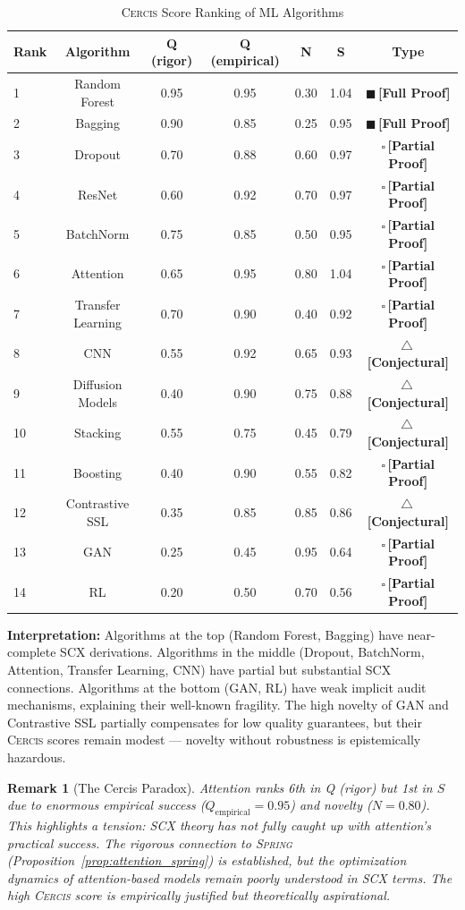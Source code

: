 \documentclass[12pt,a4paper]{article}
\newtheorem{remark}[theorem]{Remark}
\theoremstyle{definition}
\newcommand{\rigorFull}{{\color{rigorcolor}$\blacksquare$\,\textbf{[Full Proof]}}}
\newcommand{\rigorPartial}{{\color{rigorcolor}$\square$\,\textbf{[Partial Proof]}}}
\newcommand{\rigorConjectural}{{\color{red!70!black}$\triangle$\,\textbf{[Conjectural]}}}
\newcommand{\Spring}{\textsc{Spring}}
\newcommand{\Cercis}{\textsc{Cercis}}
\newcommand{\SCX}{\textsc{SCX}}
\begin{document}
\begin{table}[h]
\centering
\caption{\Cercis{} Score Ranking of ML Algorithms}
\label{tab:cercis_ranking}
\begin{tabular}{@{}lcccccc@{}}
\toprule
\textbf{Rank} & \textbf{Algorithm} & \textbf{Q (rigor)} & \textbf{Q (empirical)} & \textbf{N} & \textbf{S} & \textbf{Type} \\
\midrule
1 & Random Forest & 0.95 & 0.95 & 0.30 & 1.04 & \rigorFull \\
2 & Bagging & 0.90 & 0.85 & 0.25 & 0.95 & \rigorFull \\
3 & Dropout & 0.70 & 0.88 & 0.60 & 0.97 & \rigorPartial \\
4 & ResNet & 0.60 & 0.92 & 0.70 & 0.97 & \rigorPartial \\
5 & BatchNorm & 0.75 & 0.85 & 0.50 & 0.95 & \rigorPartial \\
6 & Attention & 0.65 & 0.95 & 0.80 & 1.04 & \rigorPartial \\
7 & Transfer Learning & 0.70 & 0.90 & 0.40 & 0.92 & \rigorPartial \\
8 & CNN & 0.55 & 0.92 & 0.65 & 0.93 & \rigorConjectural \\
9 & Diffusion Models & 0.40 & 0.90 & 0.75 & 0.88 & \rigorConjectural \\
10 & Stacking & 0.55 & 0.75 & 0.45 & 0.79 & \rigorConjectural \\
11 & Boosting & 0.40 & 0.90 & 0.55 & 0.82 & \rigorPartial \\
12 & Contrastive SSL & 0.35 & 0.85 & 0.85 & 0.86 & \rigorConjectural \\
13 & GAN & 0.25 & 0.45 & 0.95 & 0.64 & \rigorPartial \\
14 & RL & 0.20 & 0.50 & 0.70 & 0.56 & \rigorPartial \\
\bottomrule
\end{tabular}
\end{table}

\textbf{Interpretation:} Algorithms at the top (Random Forest, Bagging) have near-complete \SCX{} derivations. Algorithms in the middle (Dropout, BatchNorm, Attention, Transfer Learning, CNN) have partial but substantial \SCX{} connections. Algorithms at the bottom (GAN, RL) have weak implicit audit mechanisms, explaining their well-known fragility. The high novelty of GAN and Contrastive SSL partially compensates for low quality guarantees, but their \Cercis{} scores remain modest — novelty without robustness is epistemically hazardous.

\begin{remark}[The Cercis Paradox]
Attention ranks 6th in Q (rigor) but 1st in $S$ due to enormous empirical success ($Q_{\text{empirical}} = 0.95$) and novelty ($N = 0.80$). This highlights a tension: \SCX{} theory has not fully caught up with attention's practical success. The rigorous connection to \Spring{} (Proposition~\ref{prop:attention_spring}) is established, but the optimization dynamics of attention-based models remain poorly understood in \SCX{} terms. The high \Cercis{} score is empirically justified but theoretically aspirational.
\end{remark}
\end{document}

